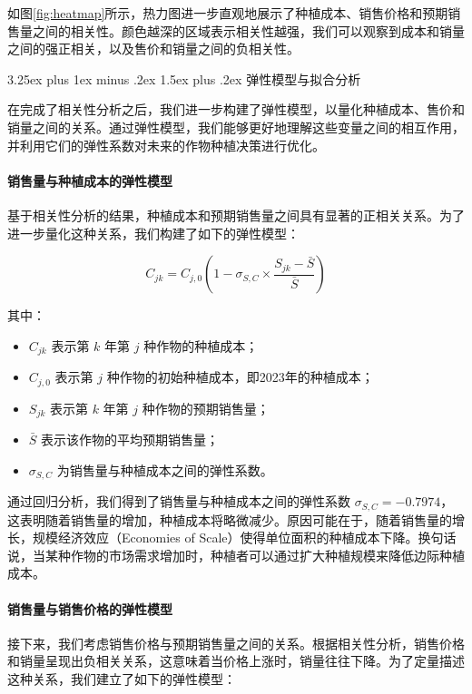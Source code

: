 \documentclass[12pt,a4paper]{nmmcm}
\makeatletter
\renewcommand\subsection{\@startsection{subsection}{2}{0pt}%
    {3.25ex plus 1ex minus .2ex}%
    {1.5ex plus .2ex}%
    {\normalfont\Large\bfseries}}
\makeatother
\begin{document}
如图\ref{fig:heatmap}所示，热力图进一步直观地展示了种植成本、销售价格和预期销售量之间的相关性。颜色越深的区域表示相关性越强，我们可以观察到成本和销量之间的强正相关，以及售价和销量之间的负相关性。

\subsection{弹性模型与拟合分析}

在完成了相关性分析之后，我们进一步构建了弹性模型，以量化种植成本、售价和销量之间的关系。通过弹性模型，我们能够更好地理解这些变量之间的相互作用，并利用它们的弹性系数对未来的作物种植决策进行优化。

\paragraph{销售量与种植成本的弹性模型}

基于相关性分析的结果，种植成本和预期销售量之间具有显著的正相关关系。为了进一步量化这种关系，我们构建了如下的弹性模型：

\[
  C_{jk} = C_{j,0} \left(1 - \sigma_{S,C} \times \frac{S_{jk} - \bar{S}}{\bar{S}} \right)
\]

其中：
\begin{itemize}
  \item $C_{jk}$ 表示第 $k$ 年第 $j$ 种作物的种植成本；
  \item $C_{j,0}$ 表示第 $j$ 种作物的初始种植成本，即2023年的种植成本；
  \item $S_{jk}$ 表示第 $k$ 年第 $j$ 种作物的预期销售量；
  \item $\bar{S}$ 表示该作物的平均预期销售量；
  \item $\sigma_{S,C}$ 为销售量与种植成本之间的弹性系数。
\end{itemize}

通过回归分析，我们得到了销售量与种植成本之间的弹性系数 $\sigma_{S,C} = -0.7974$，这表明随着销售量的增加，种植成本将略微减少。原因可能在于，随着销售量的增长，规模经济效应（Economies of Scale）使得单位面积的种植成本下降。换句话说，当某种作物的市场需求增加时，种植者可以通过扩大种植规模来降低边际种植成本。

\paragraph{销售量与销售价格的弹性模型}

接下来，我们考虑销售价格与预期销售量之间的关系。根据相关性分析，销售价格和销量呈现出负相关关系，这意味着当价格上涨时，销量往往下降。为了定量描述这种关系，我们建立了如下的弹性模型：
\end{document}
